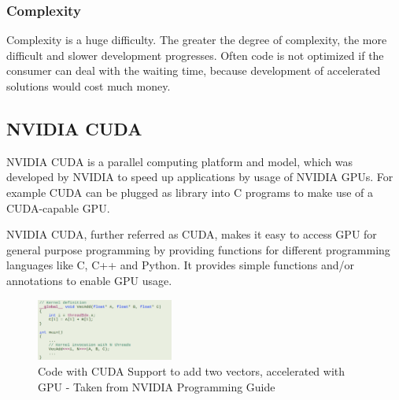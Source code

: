 \documentclass[conference]{IEEEtran}
\begin{document}
		
		\subsubsection{Complexity} Complexity is a huge difficulty. The greater the degree of complexity, the more difficult and slower development progresses. Often code is not optimized if the consumer can deal with the waiting time, because development of accelerated solutions would cost much money. \cite{?}
		
			
			
	\subsection{NVIDIA CUDA}
		
		NVIDIA CUDA is a parallel computing platform and model, which was developed by NVIDIA to speed up applications by usage of NVIDIA GPUs. For example CUDA can be plugged as library into C programs to make use of a CUDA-capable GPU. \cite{cudacpp}
		
		NVIDIA CUDA, further referred as CUDA, makes it easy to access GPU for general purpose programming by providing functions for different programming languages like C, C++ and Python. It provides simple functions and/or annotations to enable GPU usage. 
	
		\begin{figure}[htbp]
			\centerline{\includegraphics[width=0.4\textwidth]{CudaCode.png}}
			\caption{Code with CUDA Support to add two vectors, accelerated with GPU - Taken from NVIDIA Programming Guide}
			\label{fig}
		\end{figure}

	
		
\end{document}
